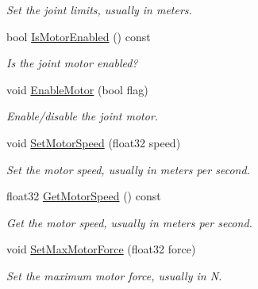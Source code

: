 \begin{DoxyCompactItemize}
\begin{DoxyCompactList}\small\item\em Set the joint limits, usually in meters. \end{DoxyCompactList}\item 
\mbox{\label{classb2PrismaticJoint_a06492dabf33439efdebceb29899c7fc9}} 
bool \hyperlink{classb2PrismaticJoint_a06492dabf33439efdebceb29899c7fc9}{Is\+Motor\+Enabled} () const
\begin{DoxyCompactList}\small\item\em Is the joint motor enabled? \end{DoxyCompactList}\item 
\mbox{\label{classb2PrismaticJoint_a4a7fd079de49f7ed5aa4a5d8d90be2a2}} 
void \hyperlink{classb2PrismaticJoint_a4a7fd079de49f7ed5aa4a5d8d90be2a2}{Enable\+Motor} (bool flag)
\begin{DoxyCompactList}\small\item\em Enable/disable the joint motor. \end{DoxyCompactList}\item 
\mbox{\label{classb2PrismaticJoint_a602ef7a6ca4fca55d011f1b38ab5a6c3}} 
void \hyperlink{classb2PrismaticJoint_a602ef7a6ca4fca55d011f1b38ab5a6c3}{Set\+Motor\+Speed} (float32 speed)
\begin{DoxyCompactList}\small\item\em Set the motor speed, usually in meters per second. \end{DoxyCompactList}\item 
\mbox{\label{classb2PrismaticJoint_a869c6edeb62ed01237b2adb09da273ae}} 
float32 \hyperlink{classb2PrismaticJoint_a869c6edeb62ed01237b2adb09da273ae}{Get\+Motor\+Speed} () const
\begin{DoxyCompactList}\small\item\em Get the motor speed, usually in meters per second. \end{DoxyCompactList}\item 
\mbox{\label{classb2PrismaticJoint_aa7817474aef15ca4815341479ac590e2}} 
void \hyperlink{classb2PrismaticJoint_aa7817474aef15ca4815341479ac590e2}{Set\+Max\+Motor\+Force} (float32 force)
\begin{DoxyCompactList}\small\item\em Set the maximum motor force, usually in N. \end{DoxyCompactList}\item 

\end{DoxyCompactItemize}
